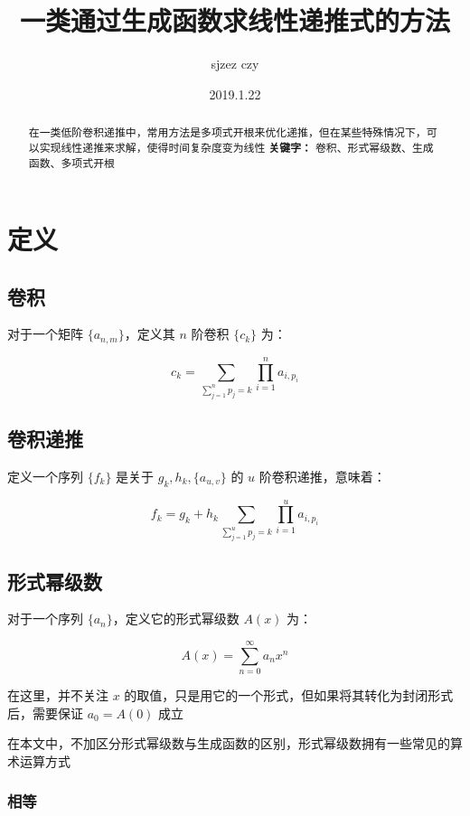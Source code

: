\documentclass[UTF8]{article}
\author {sjzez czy}
\title {一类通过生成函数求线性递推式的方法}
\date{2019.1.22}
\begin{document}
\maketitle

\begin{abstract}
    在一类低阶卷积递推中，常用方法是多项式开根来优化递推，但在某些特殊情况下，可以实现线性递推来求解，使得时间复杂度变为线性
    \newline
    \centering
    \textbf{关键字：} 卷积、形式幂级数、生成函数、多项式开根
\end{abstract}

\newpage
\tableofcontents

\newpage

\section{定义}

\subsection{卷积}

对于一个矩阵 $\{a_{n,m}\}$，定义其 $n$ 阶卷积 $\{c_k\}$ 为：

$$
c_k=\sum_{\sum_{j=1}^{n}p_j=k}\prod_{i=1}^{n} a_{i,p_i}
$$

\subsection{卷积递推}

定义一个序列 $\{f_k\}$ 是关于 $g_k,h_k,\{a_{u,v}\}$ 的 $u$ 阶卷积递推，意味着：

$$
f_k=g_k+h_k\sum_{\sum_{j=1}^{u}p_j=k}\prod_{i=1}^{u}a_{i,p_i}
$$

\subsection{形式幂级数}

对于一个序列 $\{a_n\}$，定义它的形式幂级数 $A(x)$ 为：

$$
A(x)=\sum_{n=0}^{\infty}a_nx^n
$$

在这里，并不关注 $x$ 的取值，只是用它的一个形式，但如果将其转化为封闭形式后，需要保证 $a_0=A(0)$ 成立

在本文中，不加区分形式幂级数与生成函数的区别，形式幂级数拥有一些常见的算术运算方式

\subsubsection{相等}
\end{document}
